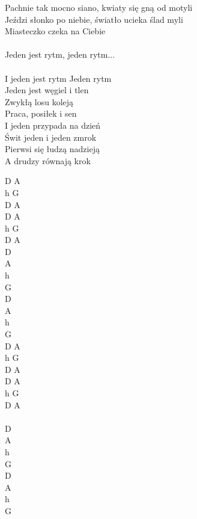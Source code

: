 \documentclass[a5paper, 10pt]{book}
\begin{document}
\begin{minipage}[t]{0.8\textwidth}
Pachnie tak mocno siano, kwiaty się gną od motyli\\
Jeździ słonko po niebie, światło ucieka ślad myli\\
Miasteczko czeka na Ciebie\\
\\
\hspace*{5mm}Jeden jest rytm, jeden rytm...\\
\\
\hspace*{5mm}I jeden jest rytm Jeden rytm\\
\hspace*{5mm}Jeden jest węgiel i tlen\\
\hspace*{5mm}Zwykłą losu koleją\\
\hspace*{5mm}Praca, posiłek i sen\\
\hspace*{5mm}I jeden przypada na dzień\\
\hspace*{5mm}Świt jeden i jeden zmrok\\
\hspace*{5mm}Pierwsi się łudzą nadzieją\\
\hspace*{5mm}A drudzy równają krok\\
\end{minipage}
\begin{minipage}[t]{0.2\textwidth}
D A\\
h G\\
D A\\

D A\\
h G\\
D A\\

D\\
A\\
h\\
G\\
D\\
A\\
h\\
G\\

D A\\
h G\\
D A\\

D A\\
h G\\
D A\\

~\\

D\\
A\\
h\\
G\\
D\\
A\\
h\\
G\\
\end{minipage}
\end{document}

